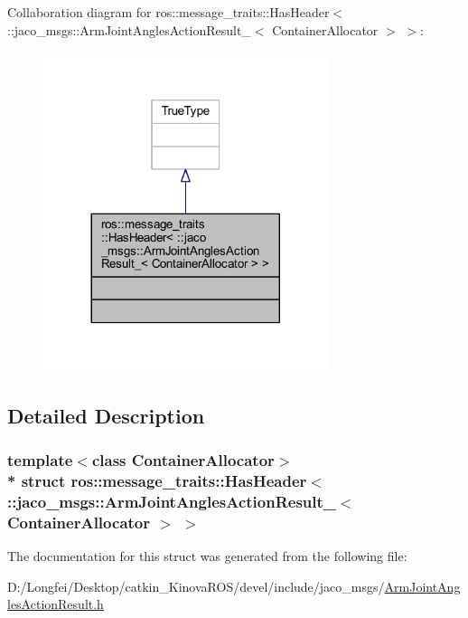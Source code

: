 Collaboration diagram for ros\+:\+:message\+\_\+traits\+:\+:Has\+Header$<$ \+:\+:jaco\+\_\+msgs\+:\+:Arm\+Joint\+Angles\+Action\+Result\+\_\+$<$ Container\+Allocator $>$ $>$\+:
\nopagebreak
\begin{figure}[H]
\begin{center}
\leavevmode
\includegraphics[width=236pt]{df/d1f/structros_1_1message__traits_1_1HasHeader_3_01_1_1jaco__msgs_1_1ArmJointAnglesActionResult___3_05393a7e88adb34246c911585fee8718d}
\end{center}
\end{figure}


\subsection{Detailed Description}
\subsubsection*{template$<$class Container\+Allocator$>$\\*
struct ros\+::message\+\_\+traits\+::\+Has\+Header$<$ \+::jaco\+\_\+msgs\+::\+Arm\+Joint\+Angles\+Action\+Result\+\_\+$<$ Container\+Allocator $>$ $>$}



The documentation for this struct was generated from the following file\+:\begin{DoxyCompactItemize}
\item 
D\+:/\+Longfei/\+Desktop/catkin\+\_\+\+Kinova\+R\+O\+S/devel/include/jaco\+\_\+msgs/\hyperlink{ArmJointAnglesActionResult_8h}{Arm\+Joint\+Angles\+Action\+Result.\+h}\end{DoxyCompactItemize}
